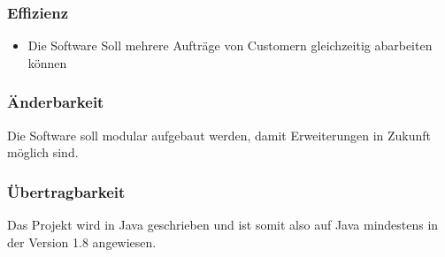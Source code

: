 \subsubsection{Effizienz}
\begin{itemize}
  \item Die Software Soll mehrere Aufträge von Customern gleichzeitig abarbeiten können
\end{itemize}
\subsubsection{Änderbarkeit}
Die Software soll modular aufgebaut werden, damit Erweiterungen in Zukunft möglich sind.
\subsubsection{Übertragbarkeit}
Das Projekt wird in Java geschrieben und ist somit also auf Java mindestens in der Version 
1.8 angewiesen.
